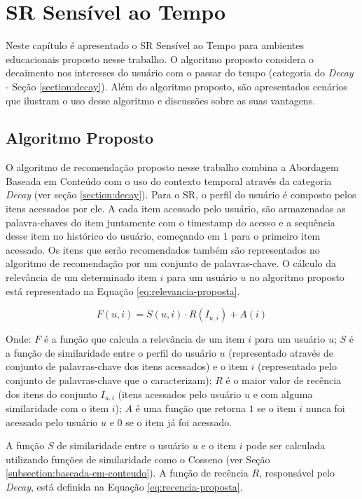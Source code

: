 \chapter{SR Sensível ao Tempo}\label{chapter:proposta}

Neste capítulo é apresentado o SR Sensível ao Tempo para ambientes educacionais proposto nesse trabalho. O algoritmo proposto
considera o decaimento nos interesses do usuário com o passar do tempo (categoria do \textit{Decay} - Seção \ref{section:decay}). Além
do algoritmo proposto, são apresentados cenários que ilustram o uso desse algoritmo e discussões sobre as suas vantagens.

\section{Algoritmo Proposto}\label{section:algoritmo-proposto}

O algoritmo de recomendação proposto nesse trabalho combina a Abordagem Baseada em Conteúdo com o uso do
contexto temporal através da categoria \textit{Decay} (ver seção \ref{section:decay}). Para o SR, o perfil do usuário é composto pelos
itens acessados por ele. A cada item acessado pelo usuário, são armazenadas as palavra-chaves
do item juntamente com o timestamp do acesso e a sequência desse item no histórico do usuário, começando em $1$ para o
primeiro item acessado. Os itens que serão recomendados também são representados no algoritmo de recomendação por um conjunto de palavras-chave. O cálculo da
relevância de um determinado item $i$ para um usuário $u$ no algoritmo proposto está representado na Equação \ref{eq:relevancia-proposta}.

\begin{equation}
  F(u,i) = S(u,i) \cdot R(I_{u,i}) + A(i)
  \label{eq:relevancia-proposta}
\end{equation}

Onde: $F$ é a função que calcula a relevância de um item $i$ para um usuário $u$; $S$ é a função de similaridade entre
o perfil do usuário $u$ (representado através de conjunto de palavras-chave dos itens acessados) e o item $i$
(representado pelo conjunto de palavras-chave que o caracterizam); $R$ é o maior valor de recência dos itens do conjunto
$I_{u,i}$ (itens acessados pelo usuário $u$ e com alguma similaridade com o item $i$); $A$ é uma função que retorna $1$
se o item $i$ nunca foi acessado pelo usuário $u$ e $0$ se o item já foi acessado.

A função $S$ de similaridade entre o usuário $u$ e o item $i$ pode ser calculada utilizando funções de similaridade como
o Cosseno (ver Seção \ref{subsection:baseada-em-conteudo}). A função de recência $R$, responsável pelo \textit{Decay}, está definida na Equação
\ref{eq:recencia-proposta}.

